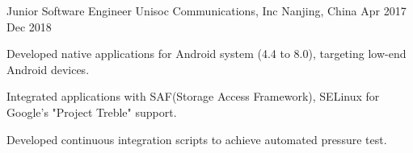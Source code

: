 \begin{cventries}
  \cventry
    {Junior Software Engineer} %
    {Unisoc Communications, Inc} %
    {Nanjing, China} %
    {Apr 2017 \textemdash Dec 2018} %
    {
      \begin{cvitems} %
        \item {Developed native applications for Android system (4.4 to 8.0), targeting low-end Android devices.}
        \item {Integrated applications with SAF(Storage Access Framework), SELinux for Google's "Project Treble" support.}
        \item {Developed continuous integration scripts to achieve automated pressure test.}
      \end{cvitems}
    }

\end{cventries}
